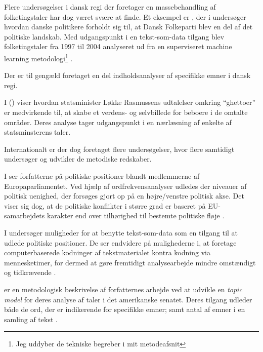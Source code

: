 Flere undersøgelser i dansk regi der foretager en massebehandling af folketingstaler har dog været svære at finde.
Et eksempel er \citeauthor{hjorthEstablishmentResponsesPopulist2018}, der i  undersøger hvordan danske politikere forholdt sig til, at Dansk Folkeparti blev en del af det politiske landskab.
Med udgangspunkt i en tekst-som-data tilgang blev folketingstaler fra 1997 til 2004 analyseret ud fra en superviseret machine learning metodologi\footnote{Jeg uddyber de tekniske begreber i mit metodeafsnit} \autocite{hjorthEstablishmentResponsesPopulist2018}.

Der er til gengæld foretaget en del indholdsanalyser af specifikke emner i dansk regi.

I  (\citeyear{andersenTaenkIkkePa2012}) viser \citeauthor{andersenTaenkIkkePa2012} hvordan statsminister Løkke Rasmussens udtalelser omkring “ghettoer” er medvirkende til, at skabe et verdens- og selvbillede for beboere i de omtalte områder.
Deres analyse tager udgangspunkt i en nærlæsning af enkelte af statsminsterens taler.

Internationalt er der dog foretaget flere undersøgelser, hvor flere samtidigt undersøger og udvikler de metodiske redskaber.

I  ser forfatterne på politiske positioner blandt medlemmerne af Europaparliamentet.
Ved hjælp af ordfrekvensanalyser udledes der niveauer af politisk uenighed, der forsøges gjort op på en højre/venstre politisk akse.
Det viser sig dog, at de politiske konflikter i større grad er baseret på EU-samarbejdets karakter end over tilhørighed til bestemte politiske fløje \autocite{prokschPositionTakingEuropean2010}.

I  undersøger \citeauthor{laverExtractingPolicyPositions2003} muligheder for at benytte tekst-som-data som en tilgang til at udlede politiske positioner.
De ser endvidere på mulighederne i, at foretage computerbaserede kodninger af tekstmaterialet kontra kodning via mennesketimer, for dermed at gøre fremtidigt analysearbejde mindre omstændigt og tidkrævende \autocite{laverExtractingPolicyPositions2003}.

 er en metodologisk beskrivelse af forfatternes arbejde ved at udvikle en \textit{topic model} for deres analyse af taler i det amerikanske senatet.
Deres tilgang udleder både de ord, der er indikerende for specifikke emner; samt antal af emner i en samling af tekst \autocite{quinnHowAnalyzePolitical2010}.

